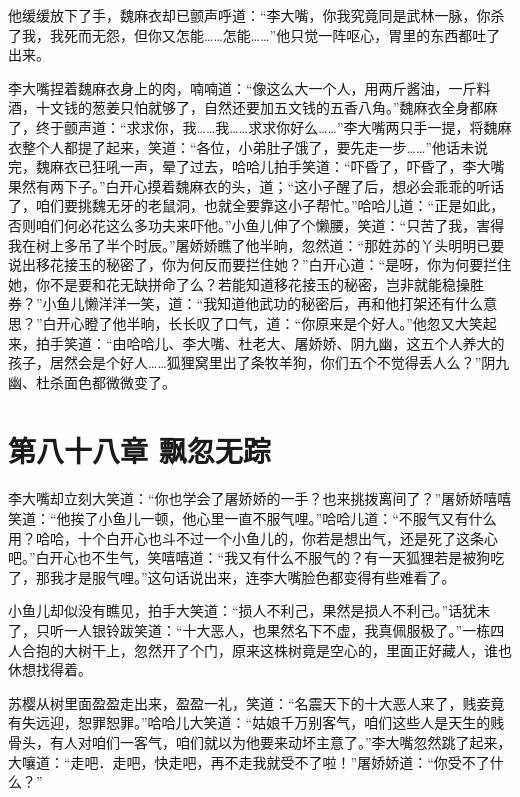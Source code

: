 \documentclass[12pt,oneside]{book}
\begin{document}
他缓缓放下了手，魏麻衣却已颤声呼道：``李大嘴，你我究竟同是武林一脉，你杀了我，我死而无怨，但你又怎能\ldots\ldots 怎能\ldots\ldots{}''他只觉一阵呕心，胃里的东西都吐了出来。

李大嘴捏着魏麻衣身上的肉，喃喃道：``像这么大一个人，用两斤酱油，一斤料酒，十文钱的葱姜只怕就够了，自然还要加五文钱的五香八角。''魏麻衣全身都麻了，终于颤声道：``求求你，我\ldots\ldots 我\ldots\ldots 求求你好么\ldots\ldots{}''李大嘴两只手一提，将魏麻衣整个人都提了起来，笑道：``各位，小弟肚子饿了，要先走一步\ldots\ldots{}''他话未说完，魏麻衣已狂吼一声，晕了过去，哈哈儿拍手笑道：``吓昏了，吓昏了，李大嘴果然有两下子。''白开心摸着魏麻衣的头，道；``这小子醒了后，想必会乖乖的听话了，咱们要挑魏无牙的老鼠洞，也就全要靠这小子帮忙。''哈哈儿道：``正是如此，否则咱们何必花这么多功夫来吓他。''小鱼儿伸了个懒腰，笑道：``只苦了我，害得我在树上多吊了半个时辰。''屠娇娇瞧了他半晌，忽然道：``那姓苏的丫头明明已要说出移花接玉的秘密了，你为何反而要拦住她？''白开心道：``是呀，你为何要拦住她，你不是要和花无缺拼命了么？若能知道移花接玉的秘密，岂非就能稳操胜券？''小鱼儿懒洋洋一笑，道：``我知道他武功的秘密后，再和他打架还有什么意思？''白开心瞪了他半晌，长长叹了口气，道：``你原来是个好人。''他忽又大笑起来，拍手笑道：``由哈哈儿、李大嘴、杜老大、屠娇娇、阴九幽，这五个人养大的孩子，居然会是个好人\ldots\ldots 狐狸窝里出了条牧羊狗，你们五个不觉得丢人么？''阴九幽、杜杀面色都微微变了。

\hypertarget{ux7b2cux516bux5341ux516bux7ae0-ux98d8ux5ffdux65e0ux8e2a}{%
\chapter{第八十八章
飘忽无踪}\label{ux7b2cux516bux5341ux516bux7ae0-ux98d8ux5ffdux65e0ux8e2a}}

李大嘴却立刻大笑道：``你也学会了屠娇娇的一手？也来挑拨离间了？''屠娇娇嘻嘻笑道：``他挨了小鱼儿一顿，他心里一直不服气哩。''哈哈儿道：``不服气又有什么用？哈哈，十个白开心也斗不过一个小鱼儿的，你若是想出气，还是死了这条心吧。''白开心也不生气，笑嘻嘻道：``我又有什么不服气的？有一天狐狸若是被狗吃了，那我才是服气哩。''这句话说出来，连李大嘴脸色都变得有些难看了。

小鱼儿却似没有瞧见，拍手大笑道：``损人不利己，果然是损人不利己。''话犹未了，只听一人银铃跋笑道：``十大恶人，也果然名下不虚，我真佩服极了。''一栋四人合抱的大树干上，忽然开了个门，原来这株树竟是空心的，里面正好藏人，谁也休想找得着。

苏樱从树里面盈盈走出来，盈盈一礼，笑道：``名震天下的十大恶人来了，贱妾竟有失远迎，恕罪恕罪。''哈哈儿大笑道：``姑娘千万别客气，咱们这些人是天生的贱骨头，有人对咱们一客气，咱们就以为他要来动坏主意了。''李大嘴忽然跳了起来，大嚷道：``走吧．走吧，快走吧，再不走我就受不了啦！''屠娇娇道：``你受不了什么？''
\end{document}
